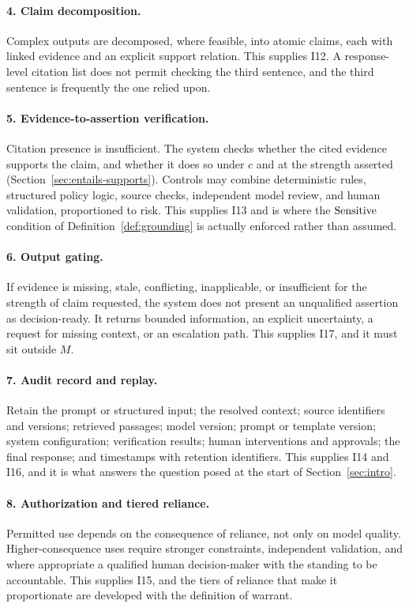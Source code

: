 \paragraph{4. Claim decomposition.} Complex outputs are decomposed, where feasible,
into atomic claims, each with linked evidence and an explicit support relation. This
supplies I12. A response-level citation list does not permit checking the third
sentence, and the third sentence is frequently the one relied upon.

\paragraph{5. Evidence-to-assertion verification.} Citation presence is
insufficient. The system checks whether the cited evidence supports the claim, and
whether it does so under $c$ and at the strength asserted
(Section~\ref{sec:entails-supports}). Controls may combine deterministic rules,
structured policy logic, source checks, independent model review, and human
validation, proportioned to risk. This supplies I13 and is where the
$\operatorname{Sensitive}$ condition of Definition~\ref{def:grounding} is actually enforced
rather than assumed.

\paragraph{6. Output gating.} If evidence is missing, stale, conflicting,
inapplicable, or insufficient for the strength of claim requested, the system does
not present an unqualified assertion as decision-ready. It returns bounded
information, an explicit uncertainty, a request for missing context, or an
escalation path. This supplies I17, and it must sit outside $M$.

\paragraph{7. Audit record and replay.} Retain the prompt or structured input; the
resolved context; source identifiers and versions; retrieved passages; model
version; prompt or template version; system configuration; verification results;
human interventions and approvals; the final response; and timestamps with
retention identifiers. This supplies I14 and I16, and it is what answers the
question posed at the start of Section~\ref{sec:intro}.

\paragraph{8. Authorization and tiered reliance.} Permitted use depends on the
consequence of reliance, not only on model quality. Higher-consequence uses require
stronger constraints, independent validation, and where appropriate a qualified
human decision-maker with the standing to be accountable. This supplies I15, and the
tiers of reliance that make it proportionate are developed with the definition of
warrant.

